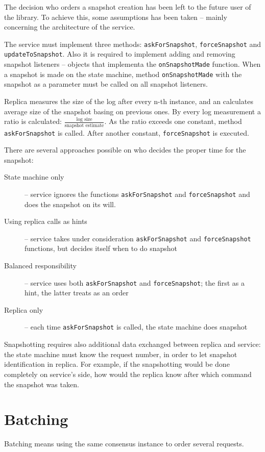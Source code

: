 The decision who orders a snapshot creation has been left to the future user of the library. To achieve this, some assumptions has been taken -- mainly
concerning the architecture of the service.

The service must implement three methods: \texttt{askForSnapshot}, \texttt{forceSnapshot} and \texttt{up\-date\-To\-Snap\-shot}. Also it is required to implement adding and removing snapshot listeners -- objects that implementa the \texttt{onSnapshotMade} function. When a snapshot is made on the state machine, method \texttt{onSnapshotMade} with the snapshot as a parameter must be called on all snapshot listeners.

Replica measures the size of the log after every n-th instance, and an calculates average size of the snapshot basing on previous ones. By every log measurement a ratio is calculated: $\frac{ \text{log size} }{ \text{snapshot estimate} }$. As the ratio exceeds one constant, method \texttt{askForSnapshot} is called. After another constant, \texttt{forceSnapshot} is executed.

There are several approaches possible on who decides the proper time for the snapshot:
\begin{description} 
 \item[State machine only] -- service ignores the functions \texttt{askForSnapshot} and \texttt{forceSnap\-shot} and does the snapshot on its will.
 \item[Using replica calls as hints] -- service takes under consideration \texttt{askForSnapshot} and \texttt{fo\-rce\-Snapshot} functions, but decides itself when to do snapshot
 \item[Balanced responsibility] -- service uses both \texttt{askForSnapshot} and \texttt{forceSnapshot}; the first as a hint, the latter treats as an order
 \item[Replica only] -- each time \texttt{askForSnapshot} is called, the state machine does snapshot
\end{description}

Snapshotting requires also additional data exchanged between replica and service: the state machine must know the request number, in order to let snapshot identification in replica. For example, if the snapshotting would be done completely on service's side, how would the replica know after which command the snapshot was taken.


\section{Batching}
\label{sec:batching}
Batching means using the same consensus instance to order several requests.

